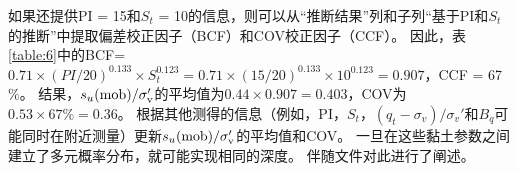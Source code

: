 \begin{Parallel}{0.60\textwidth}{}
{    }
    \ParallelRText
    {
        如果还提供PI = 15和$S_t$ = 10的信息，则可以从“推断结果”列和子列“基于PI和$S_t$的推断”中提取偏差校正因子（BCF）和COV校正因子（CCF）。 因此，表\ref{table:6}中的BCF=$0.71\times{}(PI/20)^{0.133}\times{}S_t^{0.123} = 0.71\times{}(15/20)^{0.133}\times{}10^{0.123} = 0.907$，CCF = 67$\%$。 结果，$s_u(\rm{mob})/\sigma_v'$的平均值为$0.44\times{}0.907 = 0.403$，COV为$0.53\times{}67\%= 0.36$。 根据其他测得的信息（例如，PI，$S_t$，$(q_t-\sigma_v)/\sigma_v'$和$B_q$可能同时在附近测量）更新$s_u(\rm{mob})/\sigma_v'$的平均值和COV。 一旦在这些黏土参数之间建立了多元概率分布，就可能实现相同的深度。 伴随文件对此进行了阐述\citep{Ching2014686}。
    }
\end{Parallel}